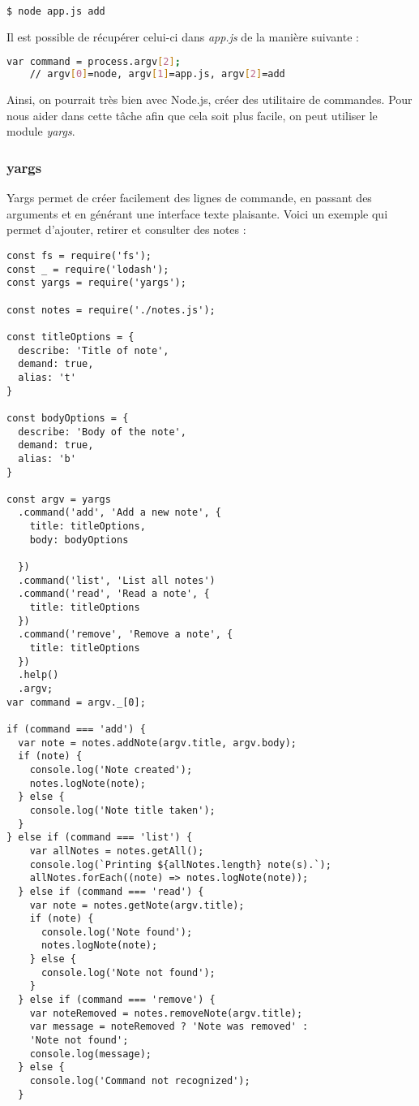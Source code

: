 \documentclass[a4paper,10pt]{article}
\begin{document}
\begin{lstlisting}[language=bash,frame=single]
    $ node app.js add
\end{lstlisting}
Il est possible de récupérer celui-ci dans \emph{app.js} de la manière suivante :

\begin{lstlisting}[language=bash,frame=single, caption={app.js}, captionpos=b]
    var command = process.argv[2]; 
    // argv[0]=node, argv[1]=app.js, argv[2]=add
\end{lstlisting}

Ainsi, on pourrait très bien avec Node.js, créer des utilitaire de commandes. Pour nous aider dans cette tâche afin que cela soit plus facile, on peut utiliser le module \emph{yargs}.

\subsubsection{yargs}
Yargs permet de créer facilement des lignes de commande, en passant des arguments et en générant une interface texte plaisante. Voici un exemple qui permet d'ajouter, retirer et consulter des notes : 

\begin{lstlisting}[frame=single, caption={note.js}, captionpos=b]
const fs = require('fs');
const _ = require('lodash');
const yargs = require('yargs');

const notes = require('./notes.js');

const titleOptions = {
  describe: 'Title of note',
  demand: true,
  alias: 't'
}

const bodyOptions = {
  describe: 'Body of the note',
  demand: true,
  alias: 'b'
}

const argv = yargs
  .command('add', 'Add a new note', {
    title: titleOptions,
    body: bodyOptions

  })
  .command('list', 'List all notes')
  .command('read', 'Read a note', {
    title: titleOptions
  })
  .command('remove', 'Remove a note', {
    title: titleOptions
  })
  .help()
  .argv;
var command = argv._[0];

if (command === 'add') {
  var note = notes.addNote(argv.title, argv.body);
  if (note) {
    console.log('Note created');
    notes.logNote(note);
  } else {
    console.log('Note title taken');
  }
} else if (command === 'list') {
    var allNotes = notes.getAll();
    console.log(`Printing ${allNotes.length} note(s).`);
    allNotes.forEach((note) => notes.logNote(note));
  } else if (command === 'read') {
    var note = notes.getNote(argv.title);
    if (note) {
      console.log('Note found');
      notes.logNote(note);
    } else {
      console.log('Note not found');
    }
  } else if (command === 'remove') {
    var noteRemoved = notes.removeNote(argv.title);
    var message = noteRemoved ? 'Note was removed' : 
    'Note not found';
    console.log(message);
  } else {
    console.log('Command not recognized');
  }
\end{lstlisting}
\end{document}
